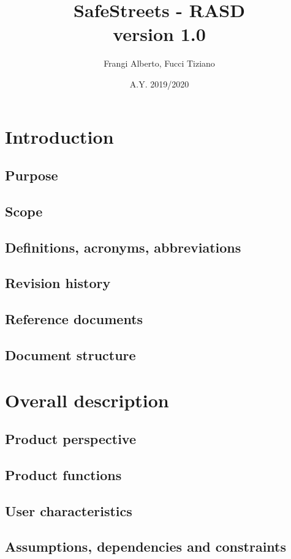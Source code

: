 \documentclass[12pt,a4paper]{report}
\title{SafeStreets - RASD \\ \large version 1.0}
\author{Frangi Alberto, Fucci Tiziano}
\date{A.Y. 2019/2020}
\begin{document}
\maketitle
\tableofcontents
\chapter{Introduction}
	\section{Purpose}
	\section{Scope}
	\section{Definitions, acronyms, abbreviations}
	\section{Revision history}
	\section{Reference documents}
	\section{Document structure}

\chapter{Overall description}
	\section{Product perspective}
	\section{Product functions}
	\section{User characteristics}
	\section{Assumptions, dependencies and constraints}
\end{document}
